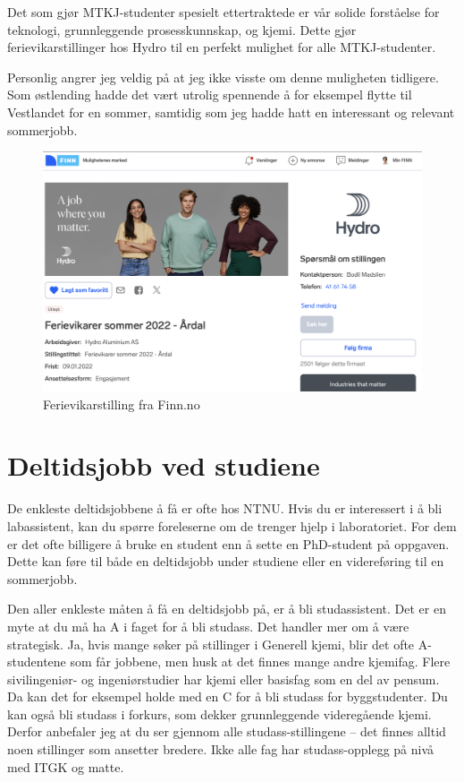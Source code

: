 Det som gjør MTKJ-studenter spesielt ettertraktede er vår solide forståelse for teknologi, grunnleggende prosesskunnskap, og kjemi. Dette gjør ferievikarstillinger hos Hydro til en perfekt mulighet for alle MTKJ-studenter.

Personlig angrer jeg veldig på at jeg ikke visste om denne muligheten tidligere. Som østlending hadde det vært utrolig spennende å for eksempel flytte til Vestlandet for en sommer, samtidig som jeg hadde hatt en interessant og relevant sommerjobb. 

\begin{figure}[H]
    \centering
    \includegraphics[width=1\linewidth]{images/hydro.png}
    \caption{Ferievikarstilling fra Finn.no}
    \label{fig:Hydro-annonse}
\end{figure}


\section{Deltidsjobb ved studiene}

De enkleste deltidsjobbene å få er ofte hos NTNU. Hvis du er interessert i å bli labassistent, kan du spørre foreleserne om de trenger hjelp i laboratoriet. For dem er det ofte billigere å bruke en student enn å sette en PhD-student på oppgaven. Dette kan føre til både en deltidsjobb under studiene eller en videreføring til en sommerjobb.

Den aller enkleste måten å få en deltidsjobb på, er å bli studassistent. Det er en myte at du må ha A i faget for å bli studass. Det handler mer om å være strategisk. Ja, hvis mange søker på stillinger i Generell kjemi, blir det ofte A-studentene som får jobbene, men husk at det finnes mange andre kjemifag. Flere sivilingeniør- og ingeniørstudier har kjemi eller basisfag som en del av pensum. Da kan det for eksempel holde med en C for å bli studass for byggstudenter. Du kan også bli studass i forkurs, som dekker grunnleggende videregående kjemi. Derfor anbefaler jeg at du ser gjennom alle studass-stillingene – det finnes alltid noen stillinger som ansetter bredere. Ikke alle fag har studass-opplegg på nivå med ITGK og matte.

